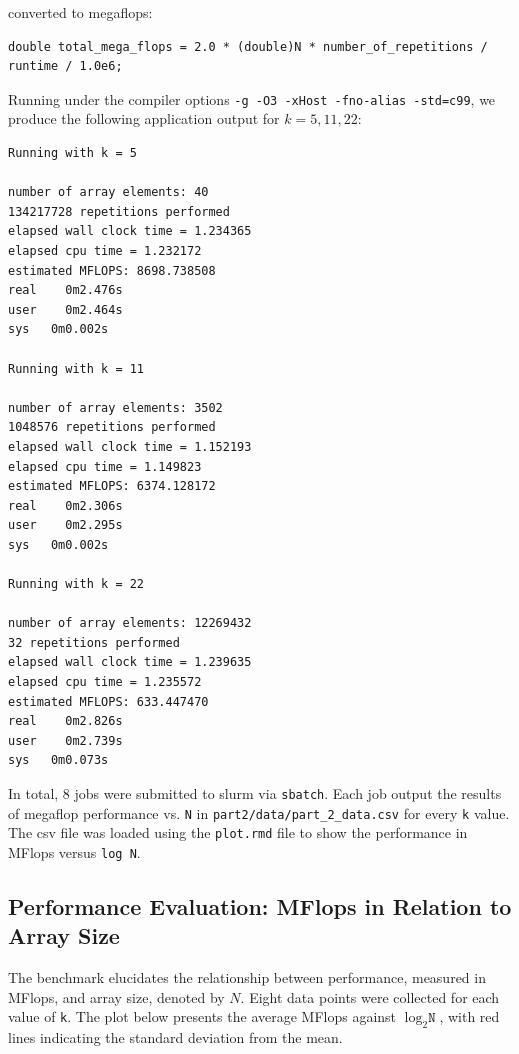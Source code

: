 \documentclass{article}
\begin{document}
converted to megaflops:
\begin{lstlisting}
double total_mega_flops = 2.0 * (double)N * number_of_repetitions / runtime / 1.0e6;
\end{lstlisting}
Running under the compiler options \texttt{-g -O3 -xHost -fno-alias -std=c99}, we produce the following application output for $k=5, 11, 22$:
\begin{lstlisting}
Running with k = 5

number of array elements: 40
134217728 repetitions performed
elapsed wall clock time = 1.234365
elapsed cpu time = 1.232172
estimated MFLOPS: 8698.738508
real	0m2.476s
user	0m2.464s
sys   0m0.002s

Running with k = 11

number of array elements: 3502
1048576 repetitions performed
elapsed wall clock time = 1.152193
elapsed cpu time = 1.149823
estimated MFLOPS: 6374.128172
real	0m2.306s
user	0m2.295s
sys   0m0.002s

Running with k = 22

number of array elements: 12269432
32 repetitions performed
elapsed wall clock time = 1.239635
elapsed cpu time = 1.235572
estimated MFLOPS: 633.447470
real	0m2.826s
user	0m2.739s
sys   0m0.073s
\end{lstlisting}
In total, 8 jobs were submitted to slurm via \texttt{sbatch}. Each job output the results of megaflop performance vs. \texttt{N} 
in \texttt{part2/data/part\_2\_data.csv} for every \texttt{k} value. The csv file was loaded using the \texttt{plot.rmd} file to show the performance in MFlops versus \texttt{log N}.

\subsection*{Performance Evaluation: MFlops in Relation to Array Size}
The benchmark elucidates the relationship between performance, measured in MFlops, and array size, denoted by $N$. Eight data points were collected for each value of \texttt{k}. The plot below presents the average MFlops against $\log_2 \texttt{N}$, with red lines indicating the standard deviation from the mean.
\end{document}
